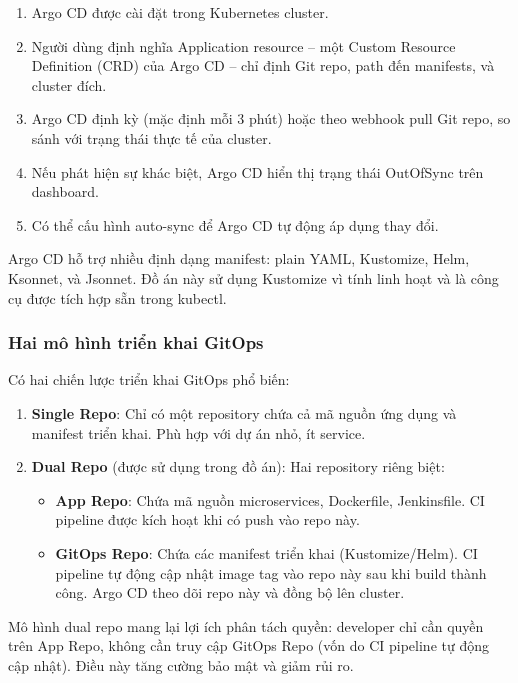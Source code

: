 \documentclass[13pt,a4paper,twoside]{extarticle}
\begin{document}
\begin{enumerate}[leftmargin=*,nosep]
  \item Argo CD được cài đặt trong Kubernetes cluster.
  \item Người dùng định nghĩa Application resource -- một Custom Resource Definition (CRD) của Argo CD -- chỉ định Git repo, path đến manifests, và cluster đích.
  \item Argo CD định kỳ (mặc định mỗi 3 phút) hoặc theo webhook pull Git repo, so sánh với trạng thái thực tế của cluster.
  \item Nếu phát hiện sự khác biệt, Argo CD hiển thị trạng thái OutOfSync trên dashboard.
  \item Có thể cấu hình auto-sync để Argo CD tự động áp dụng thay đổi.
\end{enumerate}

Argo CD hỗ trợ nhiều định dạng manifest: plain YAML, Kustomize, Helm, Ksonnet, và Jsonnet. Đồ án này sử dụng Kustomize vì tính linh hoạt và là công cụ được tích hợp sẵn trong kubectl.

\subsubsection{Hai mô hình triển khai GitOps}

Có hai chiến lược triển khai GitOps phổ biến:

\begin{enumerate}[leftmargin=*,nosep]
  \item \textbf{Single Repo}: Chỉ có một repository chứa cả mã nguồn ứng dụng và manifest triển khai. Phù hợp với dự án nhỏ, ít service.
  \item \textbf{Dual Repo} (được sử dụng trong đồ án): Hai repository riêng biệt:
  \begin{itemize}[nosep]
    \item \textbf{App Repo}: Chứa mã nguồn microservices, Dockerfile, Jenkinsfile. CI pipeline được kích hoạt khi có push vào repo này.
    \item \textbf{GitOps Repo}: Chứa các manifest triển khai (Kustomize/Helm). CI pipeline tự động cập nhật image tag vào repo này sau khi build thành công. Argo CD theo dõi repo này và đồng bộ lên cluster.
  \end{itemize}
\end{enumerate}

Mô hình dual repo mang lại lợi ích phân tách quyền: developer chỉ cần quyền trên App Repo, không cần truy cập GitOps Repo (vốn do CI pipeline tự động cập nhật). Điều này tăng cường bảo mật và giảm rủi ro.
\end{document}
